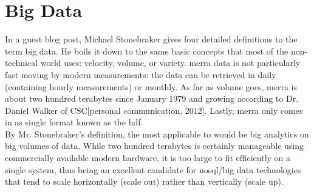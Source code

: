 \chapter{Big Data}


In a guest blog post, Michael Stonebraker gives four detailed definitions to the term big data\cite{stonebraker}. He boils it down to the same basic concepts that most of the non-technical world uses: velocity, volume, or variety. \gls{merra} data is not particularly fast moving by modern measurements: the data can be retrieved in daily (containing hourly measurements) or monthly. As far as volume goes, \gls{merra} is about two hundred terabytes since January 1979 and growing according to Dr. Daniel Walker of CSC[personal communication, 2012]. Lastly, \gls{merra} only comes in as single format known as the \gls{hdf}\cite{hdf}.\\

By Mr. Stonebraker's definition, the most applicable to \climatedge would be big analytics on big volumes of data. While two hundred terabytes is certainly manageable using commercially available modern hardware, it is too large to fit efficiently on a single system, thus being an excellent candidate for \gls{nosql}/big data technologies that tend to scale horizontally (scale out) rather than vertically (scale up).




\renewcommand\bibname{{References}}





